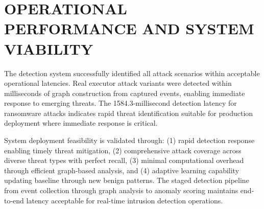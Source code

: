 \section{OPERATIONAL PERFORMANCE AND SYSTEM VIABILITY}

The detection system successfully identified all attack scenarios within acceptable operational latencies. Real executor attack variants were detected within milliseconds of graph construction from captured events, enabling immediate response to emerging threats. The 1584.3-millisecond detection latency for ransomware attacks indicates rapid threat identification suitable for production deployment where immediate response is critical.

System deployment feasibility is validated through: (1) rapid detection response enabling timely threat mitigation, (2) comprehensive attack coverage across diverse threat types with perfect recall, (3) minimal computational overhead through efficient graph-based analysis, and (4) adaptive learning capability updating baseline through new benign patterns. The staged detection pipeline from event collection through graph analysis to anomaly scoring maintains end-to-end latency acceptable for real-time intrusion detection operations. 

\clearpage